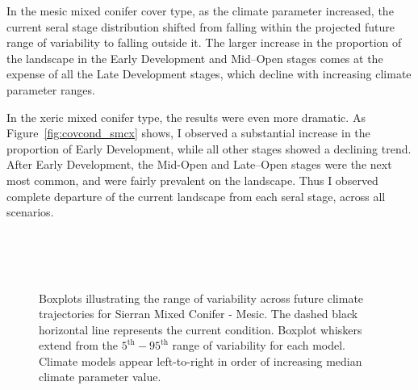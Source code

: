 In the mesic mixed conifer cover type, as the climate parameter increased, the current seral stage distribution shifted from falling within the projected future range of variability to falling outside it. The larger increase in the proportion of the landscape in the Early Development and Mid--Open stages comes at the expense of all the Late Development stages, which decline with increasing climate parameter ranges.

In the xeric mixed conifer type, the results were even more dramatic. As Figure~\ref{fig:covcond_smcx} shows, I observed a substantial increase in the proportion of Early Development, while all other stages showed a declining trend. After Early Development, the Mid-Open and Late--Open stages were the next most common, and were fairly prevalent on the landscape. Thus I observed complete departure of the current landscape from each seral stage, across all scenarios.

\begin{figure}[htbp]
 \captionsetup[subfigure]{labelformat=empty}
  \centering
   \\
   \\
     \\
  \caption{Boxplots illustrating the range of variability across future climate trajectories for Sierran Mixed Conifer - Mesic. The dashed black horizontal line represents the current condition. Boxplot whiskers extend from the $5^{\text{th}} - 95^{\text{th}}$ range of variability for each model. Climate models appear left-to-right in order of increasing median climate parameter value.}
  \label{fig:covcond_smcm}
\end{figure} %

